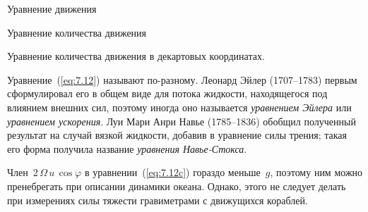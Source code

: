 \begin{chapter}{Уравнение движения}
\begin{section}{Уравнение количества движения}
\begin{paragraph}{Уравнение количества движения в декартовых координатах.}

Уравнение~(\ref{eq:7.12}) называют по-разному. Леонард Эйлер (1707--1783) 
первым сформулировал его в общем виде для потока жидкости, находящегося под
влиянием внешних сил, поэтому иногда оно называется \emph{уравнением Эйлера} 
или \emph{уравнением ускорения}. 
Луи Мари Анри Навье (1785--1836) обобщил полученный результат на случай
вязкой жидкости, добавив в уравнение силы трения; такая его форма получила 
название \emph{уравнения Навье-Стокса}.
%

Член~$2\,\Omega\,u\, \cos{\varphi}$ в уравнении~(\ref{eq:7.12c}) гораздо
меньше~$g$, поэтому ним можно пренебрегать при описании динамики
океана. Однако, этого не следует делать при измерениях силы тяжести
гравиметрами с движущихся кораблей.
%
%
\end{paragraph}


\end{section}
\end{chapter}
